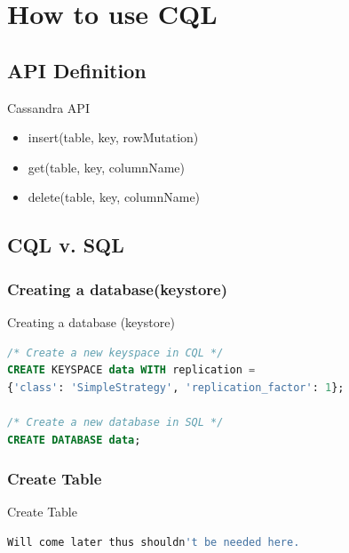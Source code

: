 \documentclass[
  10pt
]{beamer}
\begin{document}
\section{How to use CQL}  %
\subsection{API Definition}
\begin{frame}{Cassandra API}
  \begin{itemize}
    \item insert(table, key, rowMutation) \\
    \item get(table, key, columnName) \\
    \item delete(table, key, columnName) \\
  \end{itemize}
\end{frame}

\subsection{CQL v. SQL}
\subsubsection{Creating a database(keystore)}
\begin{frame}[fragile]{Creating a database (keystore)}
  \begin{lstlisting}[language=SQL]
/* Create a new keyspace in CQL */
CREATE KEYSPACE data WITH replication =
{'class': 'SimpleStrategy', 'replication_factor': 1};

/* Create a new database in SQL */
CREATE DATABASE data;
  \end{lstlisting}
\end{frame}

\subsubsection{Create Table}
\begin{frame}[fragile]{Create Table}
  \begin{lstlisting}[language=SQL]
  Will come later thus shouldn't be needed here.
  \end{lstlisting}
\end{frame}
\end{document}
